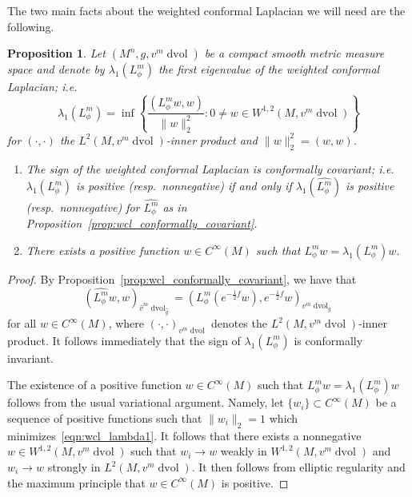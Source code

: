 \documentclass{amsart}
\newtheorem{prop}[thm]{Proposition}
\theoremstyle{definition}
\theoremstyle{remark}
\numberwithin{equation}{section}
\begin{document}
The two main facts about the weighted conformal Laplacian we will need are the following.

\begin{prop}
\label{prop:wcl_properties}
Let $(M^n,g,v^m\operatorname{dvol})$ be a compact smooth metric measure space and denote by $\lambda_1(L_\phi^m)$ the first eigenvalue of the weighted conformal Laplacian; i.e.
\begin{equation}
\label{eqn:wcl_lambda1}
\lambda_1(L_\phi^m) = \inf\left\{ \frac{(L_\phi^mw,w)}{{\lVert} w{\rVert}_2^2} \colon 0\not=w\in W^{1,2}(M,v^m\operatorname{dvol}) \right\}
\end{equation}
for $(\cdot,\cdot)$ the $L^2(M,v^m\operatorname{dvol})$-inner product and ${\lVert} w{\rVert}_2^2=(w,w)$.
\begin{enumerate}
\item The sign of the weighted conformal Laplacian is conformally covariant; i.e.\ $\lambda_1(L_\phi^m)$ is positive (resp.\ nonnegative) if and only if $\lambda_1(\widehat{L_\phi^m})$ is positive (resp.\ nonnegative) for $\widehat{L_\phi^m}$ as in Proposition~\ref{prop:wcl_conformally_covariant}.
\item There exists a positive function $w\in C^\infty(M)$ such that $L_\phi^mw=\lambda_1(L_\phi^m)w$.
\end{enumerate}
\end{prop}

\begin{proof}

By Proposition~\ref{prop:wcl_conformally_covariant}, we have that
\[ \left(\widehat{L_\phi^m}w,w\right)_{\hat v^m\operatorname{dvol}_{\hat g}} = \left( L_\phi^m( e^{-\frac{1}{2}f}w), e^{-\frac{1}{2}f}w \right)_{v^m\operatorname{dvol}_g} \]
for all $w\in C^\infty(M)$, where $(\cdot,\cdot)_{v^m\operatorname{dvol}}$ denotes the $L^2(M,v^m\operatorname{dvol})$-inner product.  It follows immediately that the sign of $\lambda_1(L_\phi^m)$ is conformally invariant.

The existence of a positive function $w\in C^\infty(M)$ such that $L_\phi^mw=\lambda_1(L_\phi^m)w$ follows from the usual variational argument.  Namely, let $\{w_i\}\subset C^\infty(M)$ be a sequence of positive functions such that ${\lVert} w_i{\rVert}_2=1$ which minimizes~\eqref{eqn:wcl_lambda1}.  It follows that there exists a nonnegative $w\in W^{1,2}(M,v^m\operatorname{dvol})$ such that $w_i\to w$ weakly in $W^{1,2}(M,v^m\operatorname{dvol})$ and $w_i\to w$ strongly in $L^2(M,v^m\operatorname{dvol})$.  It then follows from elliptic regularity and the maximum principle that $w\in C^\infty(M)$ is positive.
\end{proof}
\end{document}
